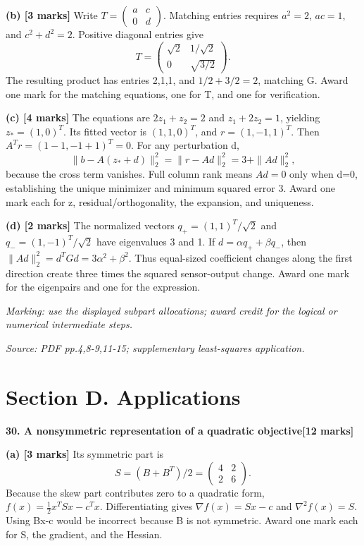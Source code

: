 \documentclass[11pt,a4paper]{article}
\begin{document}
\textbf{(b) [3 marks]} Write \(T=\begin{pmatrix}a&c\\0&d\end{pmatrix}\). Matching entries requires \(a^2=2\), \(ac=1\), and \(c^2+d^2=2\). Positive diagonal entries give \[T=\begin{pmatrix}\sqrt2&1/\sqrt2\\0&\sqrt{3/2}\end{pmatrix}.\] The resulting product has entries 2,1,1, and \(1/2+3/2=2\), matching G. Award one mark for the matching equations, one for T, and one for verification.

\textbf{(c) [4 marks]} The equations are \(2z_1+z_2=2\) and \(z_1+2z_2=1\), yielding \(z_*=(1,0)^T\). Its fitted vector is \((1,1,0)^T\), and \(r=(1,-1,1)^T\). Then \(A^Tr=(1-1,-1+1)^T=0\). For any perturbation d, \[\|b-A(z_*+d)\|_2^2=\|r-Ad\|_2^2=3+\|Ad\|_2^2,\] because the cross term vanishes. Full column rank means \(Ad=0\) only when d=0, establishing the unique minimizer and minimum squared error 3. Award one mark each for z, residual/orthogonality, the expansion, and uniqueness.

\textbf{(d) [2 marks]} The normalized vectors \(q_+=(1,1)^T/\sqrt2\) and \(q_-=(1,-1)^T/\sqrt2\) have eigenvalues 3 and 1. If \(d=\alpha q_++\beta q_-\), then \(\|Ad\|_2^2=d^TGd=3\alpha^2+\beta^2\). Thus equal-sized coefficient changes along the first direction create three times the squared sensor-output change. Award one mark for the eigenpairs and one for the expression.

\textit{Marking: use the displayed subpart allocations; award credit for the logical or numerical intermediate steps.}\par
{\footnotesize\textit{Source: PDF pp.4,8-9,11-15; supplementary least-squares application.}}
\newpage\section*{Section D. Applications}
\textbf{30. A nonsymmetric representation of a quadratic objective}\hfill\textbf{[12 marks]}\par\medskip
\textbf{(a) [3 marks]} Its symmetric part is \[S=(B+B^T)/2=\begin{pmatrix}4&2\\2&6\end{pmatrix}.\] Because the skew part contributes zero to a quadratic form, \(f(x)=\tfrac12x^TSx-c^Tx\). Differentiating gives \(\nabla f(x)=Sx-c\) and \(\nabla^2f(x)=S\). Using Bx-c would be incorrect because B is not symmetric. Award one mark each for S, the gradient, and the Hessian.
\end{document}
